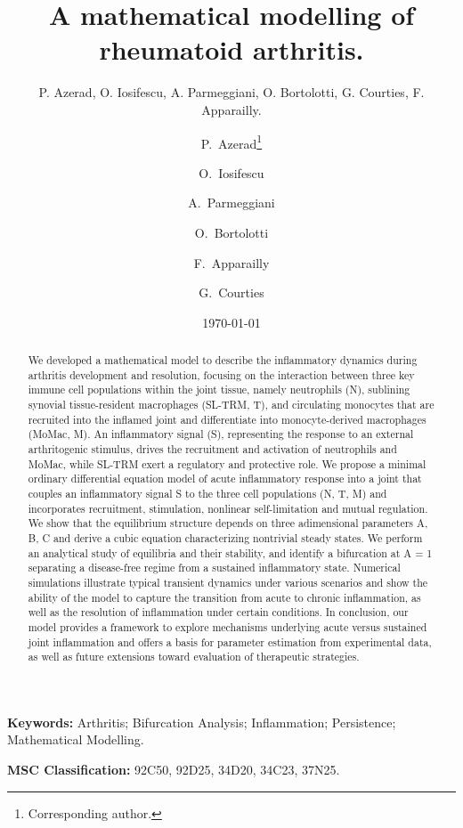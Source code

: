 \documentclass[a4paper, 12pt]{article}
\title{A mathematical modelling of rheumatoid arthritis.}
\author{ P. Azerad, O. Iosifescu, A. Parmeggiani, O. Bortolotti,  G. Courties, F. Apparailly. }
\date{\today}
\author[1]{P.~Azerad\thanks{Corresponding author.}}
\author[1]{O.~Iosifescu}
\author[2]{A.~Parmeggiani}
\author[3]{O.~Bortolotti}
\author[3,4]{F.~Apparailly}
\author[3]{G.~Courties}
\affil[1]{IMAG, UMR5149, Université de Montpellier, France}
\affil[2]{L2C, UMR5221, Université de Montpellier, France}
\affil[3]{IRMB, UMR1183, Université de Montpellier, INSERM, France}
\affil[4]{Clinical Department for osteoarticular diseases, Montpellier University Hospital Lapeyronie, France}
\newcommand{\keywords}[1]{%
  \par\noindent\textbf{Keywords: }#1
}
\newcommand{\msc}[1]{%
  \par\noindent\textbf{MSC Classification: }#1
}
\begin{document}
\maketitle 
\begin{abstract}
We developed a mathematical model to describe the inflammatory dynamics 
during arthritis development and resolution, focusing on the interaction between three key immune cell populations 
within the joint tissue, namely neutrophils (N),  sublining synovial tissue-resident macrophages (SL-TRM, T),
 and circulating monocytes that are recruited into the inflamed joint and differentiate into monocyte-derived macrophages (MoMac, M).
An inflammatory signal (S), representing the response to an external arthritogenic stimulus, 
drives the recruitment and activation of neutrophils and MoMac, while SL-TRM exert a regulatory and protective role.
We propose a minimal ordinary differential equation model of acute inflammatory response into a joint that couples an inflammatory signal S to the three cell populations (N, T, M) and incorporates recruitment, stimulation, nonlinear self-limitation and mutual regulation.
 We show that the equilibrium structure depends on three adimensional parameters A, B, C and derive a cubic equation characterizing nontrivial steady states.
We perform an analytical study of equilibria and their stability, and identify a bifurcation at A = 1 separating a disease-free regime from a sustained inflammatory state. 
Numerical simulations illustrate typical transient dynamics under various scenarios and show the ability of the model to capture the transition from acute to chronic inflammation, as well as the resolution of inflammation under certain conditions. 
In conclusion, our model provides a framework to explore mechanisms underlying acute versus sustained joint inflammation and offers a basis for parameter estimation from experimental data, as well as future extensions toward evaluation of therapeutic strategies.

\end{abstract}
\keywords{Arthritis;  Bifurcation Analysis; Inflammation; Persistence; Mathematical Modelling.}
\msc{92C50, 92D25, 34D20, 34C23, 37N25.}
\end{document}
